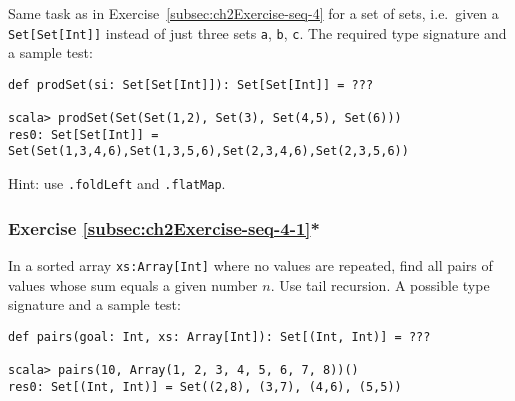 Same task as in Exercise~\ref{subsec:ch2Exercise-seq-4} for a set
of sets, i.e.~given a \lstinline!Set[Set[Int]]!
instead of just three sets \lstinline!a!,
\lstinline!b!, \lstinline!c!.
The required type signature and a sample test:
\begin{lstlisting}
def prodSet(si: Set[Set[Int]]): Set[Set[Int]] = ???

scala> prodSet(Set(Set(1,2), Set(3), Set(4,5), Set(6)))
res0: Set[Set[Int]] = Set(Set(1,3,4,6),Set(1,3,5,6),Set(2,3,4,6),Set(2,3,5,6))
\end{lstlisting}
Hint: use \lstinline!.foldLeft!
and \lstinline!.flatMap!.%
\begin{comment}
Solution:\inputencoding{latin9}
\begin{lstlisting}
def prodSet(sets: Set[Set[Int]]): Set[Set[Int]] =     sets.foldLeft(Set[Set[Int]](Set())) {
      // Combine each of results so far with each element in current set
      case (accumSet: Set[Set[Int]], currSet: Set[Int]) =>
        for {
          s <- accumSet
          i <- currSet
        } yield s + i
      }
\end{lstlisting}
\inputencoding{utf8}\end{comment}


\subsubsection{Exercise \label{subsec:ch2Exercise-seq-4-1}\ref{subsec:ch2Exercise-seq-4-1}{*}}

In a sorted array \lstinline!xs:Array[Int]!
where no values are repeated, find all pairs of values whose sum equals
a given number $n$. Use tail recursion. A possible type signature
and a sample test:
\begin{lstlisting}
def pairs(goal: Int, xs: Array[Int]): Set[(Int, Int)] = ???

scala> pairs(10, Array(1, 2, 3, 4, 5, 6, 7, 8))()
res0: Set[(Int, Int)] = Set((2,8), (3,7), (4,6), (5,5))
\end{lstlisting}
\begin{comment}
Solution:\inputencoding{latin9}
\begin{lstlisting}
@tailrec def pairs(goal: Int, xs: Array[Int])(res: Set[(Int, Int)] = Set(), left: Int = 0, right: Int = xs.length): Set[(Int, Int)] = if (left == right) res else {
  val sum = xs(left) + xs(right - 1)
  val (newLeft, newRight, newRes) = if (sum == goal) (left + 1, right, res + ((xs(left), xs(right - 1)))) else if (sum < goal) (left + 1, right, res) else (left, right - 1, res)
  pairs(goal, xs)(newRes, newLeft, newRight)
}
\end{lstlisting}
\inputencoding{utf8}\end{comment}


